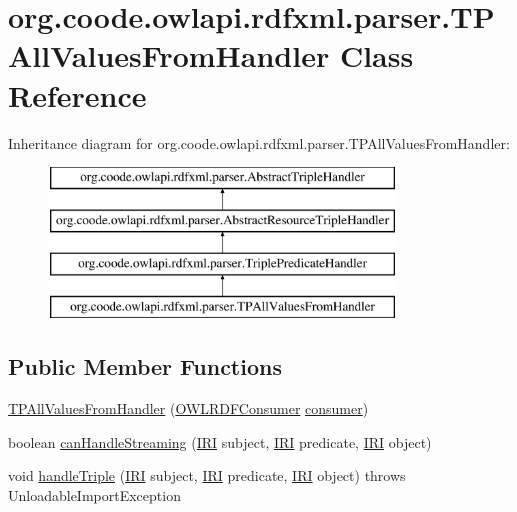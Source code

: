 \hypertarget{classorg_1_1coode_1_1owlapi_1_1rdfxml_1_1parser_1_1_t_p_all_values_from_handler}{\section{org.\-coode.\-owlapi.\-rdfxml.\-parser.\-T\-P\-All\-Values\-From\-Handler Class Reference}
\label{classorg_1_1coode_1_1owlapi_1_1rdfxml_1_1parser_1_1_t_p_all_values_from_handler}
}
Inheritance diagram for org.\-coode.\-owlapi.\-rdfxml.\-parser.\-T\-P\-All\-Values\-From\-Handler\-:\begin{figure}[H]
\begin{center}
\leavevmode
\includegraphics[height=4.000000cm]{classorg_1_1coode_1_1owlapi_1_1rdfxml_1_1parser_1_1_t_p_all_values_from_handler}
\end{center}
\end{figure}
\subsection*{Public Member Functions}
\begin{DoxyCompactItemize}
\item 
\hyperlink{classorg_1_1coode_1_1owlapi_1_1rdfxml_1_1parser_1_1_t_p_all_values_from_handler_addbbbc5ba785afc5e7b5c878f1566fa1}{T\-P\-All\-Values\-From\-Handler} (\hyperlink{classorg_1_1coode_1_1owlapi_1_1rdfxml_1_1parser_1_1_o_w_l_r_d_f_consumer}{O\-W\-L\-R\-D\-F\-Consumer} \hyperlink{classorg_1_1coode_1_1owlapi_1_1rdfxml_1_1parser_1_1_abstract_triple_handler_a4ccf4d898ff01eb1cadfa04b23d54e9c}{consumer})
\item 
boolean \hyperlink{classorg_1_1coode_1_1owlapi_1_1rdfxml_1_1parser_1_1_t_p_all_values_from_handler_a64d6c65eb7980b2e962a481549e06ce1}{can\-Handle\-Streaming} (\hyperlink{classorg_1_1semanticweb_1_1owlapi_1_1model_1_1_i_r_i}{I\-R\-I} subject, \hyperlink{classorg_1_1semanticweb_1_1owlapi_1_1model_1_1_i_r_i}{I\-R\-I} predicate, \hyperlink{classorg_1_1semanticweb_1_1owlapi_1_1model_1_1_i_r_i}{I\-R\-I} object)
\item 
void \hyperlink{classorg_1_1coode_1_1owlapi_1_1rdfxml_1_1parser_1_1_t_p_all_values_from_handler_aee3126874c09d35e09d4ea094cfdba58}{handle\-Triple} (\hyperlink{classorg_1_1semanticweb_1_1owlapi_1_1model_1_1_i_r_i}{I\-R\-I} subject, \hyperlink{classorg_1_1semanticweb_1_1owlapi_1_1model_1_1_i_r_i}{I\-R\-I} predicate, \hyperlink{classorg_1_1semanticweb_1_1owlapi_1_1model_1_1_i_r_i}{I\-R\-I} object)  throws Unloadable\-Import\-Exception 
\end{DoxyCompactItemize}
